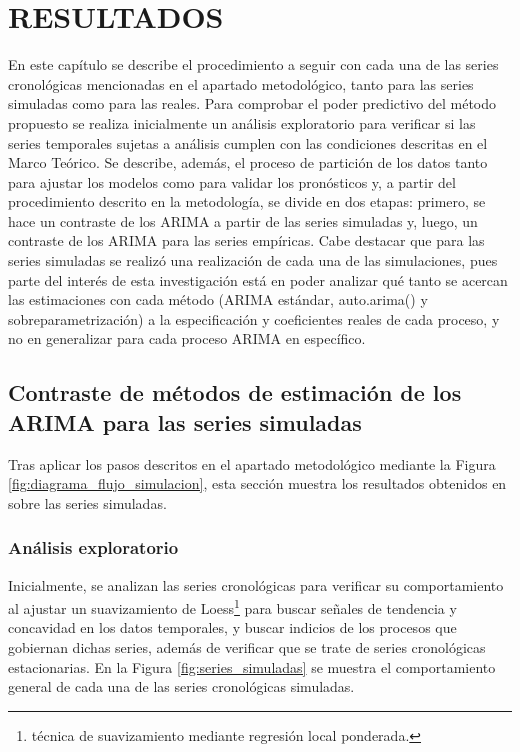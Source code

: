 \documentclass[
]{article}
\begin{document}
\newpage

\section{RESULTADOS} 


\label{chap:resultados}

En este capítulo se describe el procedimiento a seguir con cada una de
las series cronológicas mencionadas en el apartado metodológico, tanto
para las series simuladas como para las reales. Para comprobar el poder
predictivo del método propuesto se realiza inicialmente un análisis
exploratorio para verificar si las series temporales sujetas a análisis
cumplen con las condiciones descritas en el Marco Teórico. Se describe,
además, el proceso de partición de los datos tanto para ajustar los
modelos como para validar los pronósticos y, a partir del procedimiento
descrito en la metodología, se divide en dos etapas: primero, se hace un
contraste de los ARIMA a partir de las series simuladas y, luego, un
contraste de los ARIMA para las series empíricas. Cabe destacar que para
las series simuladas se realizó una realización de cada una de las
simulaciones, pues parte del interés de esta investigación está en poder
analizar qué tanto se acercan las estimaciones con cada método (ARIMA
estándar, auto.arima() y sobreparametrización) a la especificación y
coeficientes reales de cada proceso, y no en generalizar para cada
proceso ARIMA en específico.

\subsection{Contraste de métodos de estimación de los ARIMA para las series simuladas}

Tras aplicar los pasos descritos en el apartado metodológico mediante la
Figura \ref{fig:diagrama_flujo_simulacion}, esta sección muestra los
resultados obtenidos en sobre las series simuladas.

\subsubsection{Análisis exploratorio}

Inicialmente, se analizan las series cronológicas para verificar su
comportamiento al ajustar un suavizamiento de Loess\footnote{técnica de
  suavizamiento mediante regresión local ponderada.} para buscar señales
de tendencia y concavidad en los datos temporales, y buscar indicios de
los procesos que gobiernan dichas series, además de verificar que se
trate de series cronológicas estacionarias. En la Figura
\ref{fig:series_simuladas} se muestra el comportamiento general de cada
una de las series cronológicas simuladas.
\end{document}
